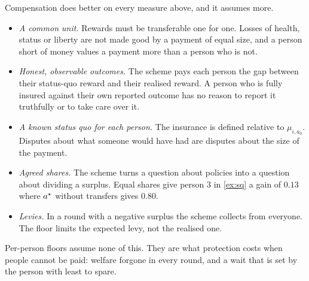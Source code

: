 Compensation does better on every measure above, and it assumes more.
\begin{itemize}[leftmargin=*,itemsep=1pt]
  \item \emph{A common unit.} Rewards must be transferable one for one. Losses of health, status or liberty are not made good by a payment of equal size, and a person short of money values a payment more than a person who is not.
  \item \emph{Honest, observable outcomes.} The scheme pays each person the gap between their status-quo reward and their realised reward. A person who is fully insured against their own reported outcome has no reason to report it truthfully or to take care over it.
  \item \emph{A known status quo for each person.} The insurance is defined relative to $\mu_{i,a_0}$. Disputes about what someone would have had are disputes about the size of the payment.
  \item \emph{Agreed shares.} The scheme turns a question about policies into a question about dividing a surplus. Equal shares give person 3 in \cref{ex:sq} a gain of $0.13$ where $a^\star$ without transfers gives $0.80$.
  \item \emph{Levies.} In a round with a negative surplus the scheme collects from everyone. The floor limits the expected levy, not the realised one.
\end{itemize}
Per-person floors assume none of this. They are what protection costs when people cannot be paid: welfare forgone in every round, and a wait that is set by the person with least to spare.
